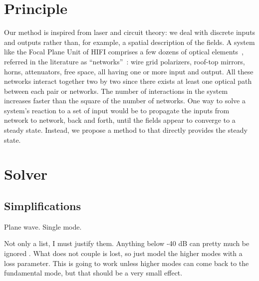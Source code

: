 \section{Principle}
Our method is inspired from laser and circuit theory: we deal with discrete inputs and outputs rather than, for example, a spatial description of the fields.
A system like the Focal Plane Unit of HIFI comprises a few dozens of optical elements~\cite{jackson2002hifi}, referred in the literature as ``networks''~\cite{siegman1986lasers}: wire grid polarizers, roof-top mirrors, horns, attenuators, free space, all having one or more input and output.
All these networks interact together two by two since there exists at least one optical path between each pair or networks.
The number of interactions in the system increases faster than the square of the number of networks.
One way to solve a system's reaction to a set of input would be to propagate the inputs from network to network, back and forth, until the fields appear to converge to a steady state.
Instead, we propose a method to that directly provides the steady state.

\section{Solver}

\subsection{Simplifications}

Plane wave.
Single mode.

Not only a list, I must justify them.
Anything below -40 dB can pretty much be ignored .
What does not couple is lost, so just model the higher modes with a loss parameter.
This is going to work unless higher modes can come back to the fundamental mode, but that should be a very small effect.




